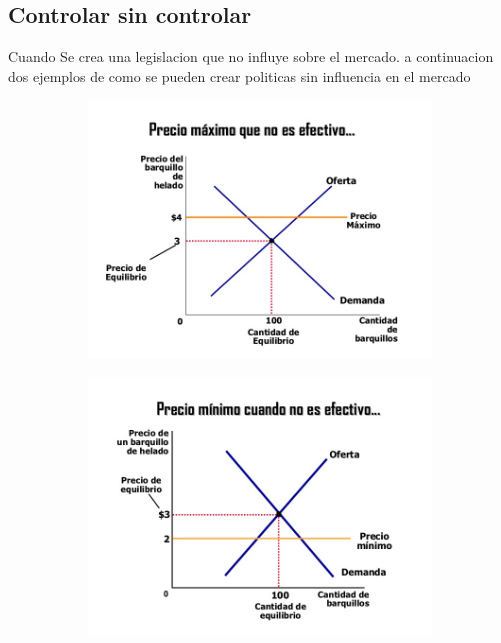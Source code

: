 \subsection{Controlar sin controlar}
Cuando Se crea una legislacion que no influye sobre el mercado. a continuacion dos ejemplos de como se pueden crear politicas sin influencia en el mercado 
\begin{center}
	\begin{figure}[h]
		\centering
		\begin{subfigure}	
			\left
			\includegraphics[scale=0.3]{images/61.jpg}
		\end{subfigure} 	
		\begin{subfigure}
			\left	
			\includegraphics[scale=0.3]{images/62.jpg}

\end{subfigure}
\end{figure}
\end{center}
